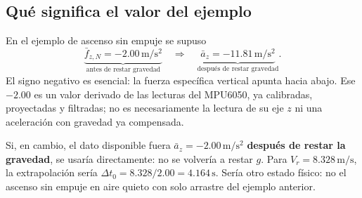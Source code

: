 \documentclass[11pt,a4paper]{article}
\begin{document}
\subsection{Qué significa el valor del ejemplo}
En el ejemplo de ascenso sin empuje se supuso
\begin{equation}
 \underbrace{\bar f_{z,N}=-2.00\,\mathrm{m/s^2}}_{\text{antes de restar gravedad}}
 \quad\Longrightarrow\quad
 \underbrace{\bar a_z=-11.81\,\mathrm{m/s^2}}_{\text{después de restar gravedad}}.
\end{equation}
El signo negativo es esencial: la fuerza específica vertical apunta hacia abajo. Ese $-2.00$ es un valor derivado de las lecturas del MPU6050, ya calibradas, proyectadas y filtradas; no es necesariamente la lectura de su eje $z$ ni una aceleración con gravedad ya compensada.

Si, en cambio, el dato disponible fuera $\bar a_z=-2.00\,\mathrm{m/s^2}$ \textbf{después de restar la gravedad}, se usaría directamente: no se volvería a restar $g$. Para $V_r=8.328\,\mathrm{m/s}$, la extrapolación sería $\Delta t_0=8.328/2.00=4.164\,\mathrm{s}$. Sería otro estado físico: no el ascenso sin empuje en aire quieto con solo arrastre del ejemplo anterior.
\end{document}
